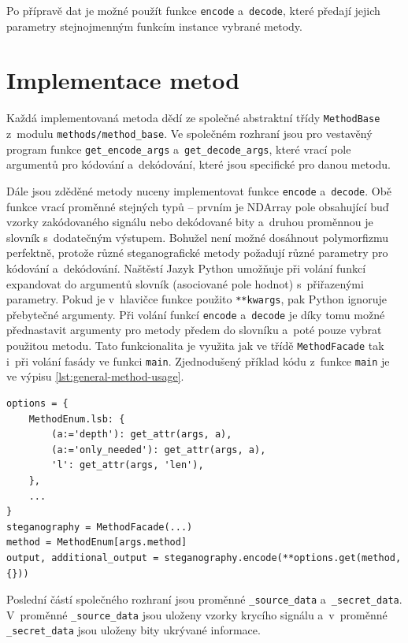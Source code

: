 Po přípravě dat je možné použít funkce \texttt{encode} a~\texttt{decode}, které
předají jejich parametry stejnojmenným funkcím instance vybrané metody.

\section{Implementace metod}
\label{sec:method-implementation}

Každá implementovaná metoda dědí ze společné abstraktní třídy
\texttt{MethodBase} z~modulu \texttt{methods/method\_base}. Ve společném
rozhraní jsou pro vestavěný program funkce \texttt{get\_encode\_args}
a~\texttt{get\_decode\_args}, které vrací pole argumentů pro kódování
a~dekódování, které jsou specifické pro danou metodu.

Dále jsou zděděné metody nuceny implementovat funkce \texttt{encode}
a~\texttt{decode}. Obě funkce vrací proměnné stejných typů -- prvním je NDArray
pole obsahující buď vzorky zakódovaného signálu nebo dekódované bity a~druhou
proměnnou je slovník s~dodatečným výstupem. Bohužel není možné dosáhnout
polymorfizmu perfektně, protože různé steganografické metody požadují různé
parametry pro kódování a~dekódování. Naštěstí Jazyk Python umožňuje při volání
funkcí expandovat do argumentů slovník (asociované pole hodnot) s~přiřazenými
parametry. Pokud je v~hlavičce funkce použito \texttt{**kwargs}, pak Python
ignoruje přebytečné argumenty. Při volání funkcí \texttt{encode}
a~\texttt{decode} je díky tomu možné přednastavit argumenty pro metody předem
do slovníku a~poté pouze vybrat použitou metodu. Tato funkcionalita je využita
jak ve třídě \texttt{MethodFacade} tak i~při volání fasády ve funkci
\texttt{main}. Zjednodušený příklad kódu z~funkce \texttt{main} je ve výpisu
\ref{lst:general-method-usage}.

\begin{lstlisting}[language=PythonPlus, label={lst:general-method-usage},
caption={Zobecněné použití fasády a~steganografických metod.}]
options = {
    MethodEnum.lsb: {
        (a:='depth'): get_attr(args, a),
        (a:='only_needed'): get_attr(args, a),
        'l': get_attr(args, 'len'),
    },
    ...
}
steganography = MethodFacade(...)
method = MethodEnum[args.method]
output, additional_output = steganography.encode(**options.get(method, {}))
\end{lstlisting}

Poslední částí společného rozhraní jsou proměnné \texttt{\_source\_data}
a~\texttt{\_secret\_data}. V~proměnné \texttt{\_source\_data} jsou uloženy
vzorky krycího signálu a~v~proměnné \texttt{\_secret\_data} jsou uloženy bity
ukrývané informace.

